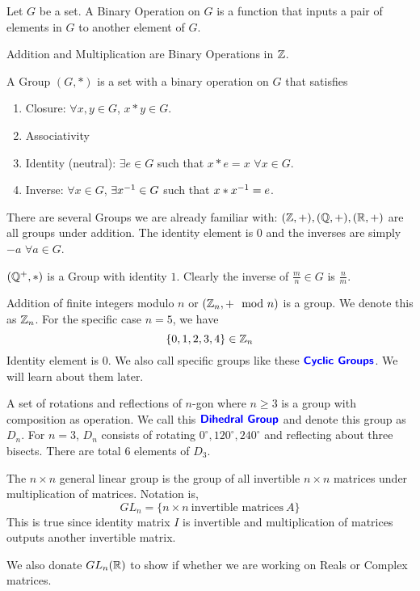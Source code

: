 \begin{definition*}
    Let $G$ be a set. A \alert{Binary Operation} on $G$ is a function that inputs a pair of elements in $G$ to another element of $G$.
\end{definition*}
\begin{example}
    Addition and Multiplication are Binary Operations in $\mathbb Z$.
\end{example}
\begin{definition*}
    A \alert{Group} $(G,\ast)$ is a set with a binary operation on $G$ that satisfies
    \begin{enumerate}
        \item Closure: $\forall x,y \in G$, $x \ast y \in G$.
        \item Associativity
        \item Identity (neutral): $\exists e \in G$ such that $x \ast e = x$ $\forall x \in G$.
        \item Inverse: $\forall x \in G$, $\exists x ^{-1} \in G$ such that $x \ast x ^{-1} = e$.
    \end{enumerate}
\end{definition*}
\begin{example}
    There are several Groups we are already familiar with: $(\mathbb Z, +),(\mathbb Q, +),(\mathbb R, +)$ are all groups under addition. The identity element
    is $0$ and the inverses are simply $-a$ $ \forall a \in G$.
\end{example}
\begin{example}
    $(\mathbb Q^+,*)$ is a Group with identity $1$. Clearly the inverse of $\frac{m}{n} \in G$ is $\frac{n}{m}$.
\end{example}
\begin{example}
    Addition of finite integers modulo $n$ or $(\mathbb Z_n, + \mod n)$ is a group. We denote this as $\mathbb Z_n$. For the specific case $n= 5$, we have
    \[ \{ 0,1,2,3,4\} \in \mathbb Z_n\]
    Identity element is $0$. We also call specific groups like these $\textbf{\color{blue}\sffamily Cyclic Groups}$. We will learn about them later.
\end{example}
\begin{example}
    A set of rotations and reflections of $n$-gon where $n \ge 3$ is a group with composition as operation. We call this $\textbf{\color{blue}\sffamily Dihedral
    Group}$ and denote this group as $D_n$.
    For $n =3$, $D_n$ consists of rotating $0^\circ, 120^ \circ ,240 ^\circ$ and reflecting about three bisects. There are total $6$
    elements of $D_3$.
\end{example}
\begin{example}
    The $n \times n$ \alert{general linear group} is the group of all invertible $n \times n$ matrices under multiplication of matrices. Notation is,
    \[ GL_n= \{ n \times n \ \text{invertible matrices} \ A\}\]
    This is true since identity matrix $I$ is invertible and multiplication of matrices outputs another invertible matrix.

    We also donate $GL_n(\mathbb R)$ to show if whether we are working on Reals or Complex matrices.
\end{example}
